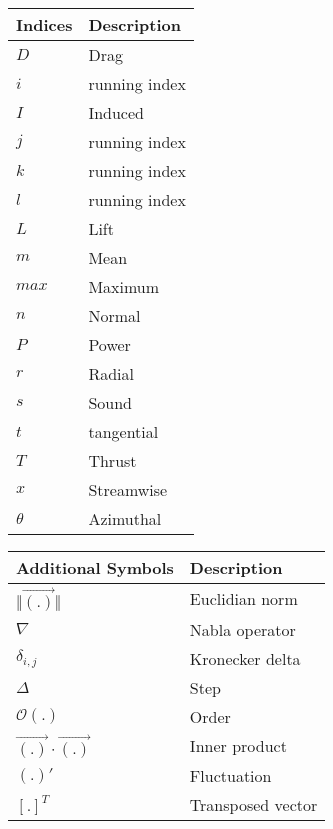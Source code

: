 \vspace{0.5cm}
\begin{longtable}{p{7cm}p{7cm}}
	Indices & Description  \\ \hline
	$D$ 	& Drag \\
	$i$		& running index \\
	$I$		& Induced \\
	$j$		& running index \\
	$k$		& running index \\
	$l$		& running index \\
	$L$		& Lift \\
    $m$     & Mean \\
    $max$	& Maximum \\
    $n$		& Normal \\
    $P$		& Power \\
    $r$		& Radial \\
    $s$		& Sound \\
    $t$		& tangential \\
    $T$		& Thrust \\
    $x$		& Streamwise \\
    $\theta$& Azimuthal \\
\end{longtable}

\vspace{0.5cm}

\begin{longtable}{p{7cm}p{7cm}}
	Additional Symbols          & Description    \\ \hline
	$\Vert \vec{(.)} \Vert $    & Euclidian norm \\
	$\nabla$                    & Nabla operator \\
	$\delta_{i,j}$				& Kronecker delta \\
	$\Delta$                    & Step \\
	$\mathcal{O}(.)$			& Order \\
	$\vec{(.)} \cdot \vec{(.)}$ & Inner product \\
	$(.)'$						& Fluctuation \\
	$[.]^T$						& Transposed vector \\	
\end{longtable}

\vspace{0.5cm}

